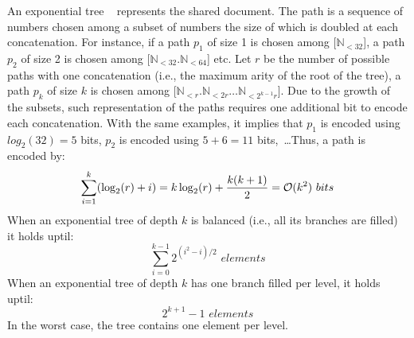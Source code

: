 \begin{asparadesc}
\item [An exponential tree]~\cite{andersson1996faster,andersson2007dynamic}
  represents the shared document. The path is a sequence of numbers chosen among
  a subset of numbers the size of which is doubled at each concatenation. For
  instance, if a path $p_1$ of size 1 is chosen among [$\mathbb{N}_{<32}$], a
  path $p_2$ of size 2 is chosen among [$\mathbb{N}_{<32}.\mathbb{N}_{<64}$]
  etc. Let $r$ be the number of possible paths with one concatenation (i.e., the
  maximum arity of the root of the tree), a path $p_k$ of size $k$ is chosen
  among [$\mathbb{N}_{<r}.\mathbb{N}_{<2r}\ldots\mathbb{N}_{<2^{k-1}r}$].  Due
  to the growth of the subsets, such representation of the paths requires one
  additional bit to encode each concatenation. With the same examples, it
  implies that $p_1$ is encoded using $log_2(32)=5$ bits, $p_2$ is encoded using
  $5+6=11$ bits,~\ldots Thus, a path is encoded by:
  \begin{equation}
    \sum\limits_{i=1}^{k}(\log_2(r)+i) =
    k\log_2(r) + {k(k+1)\over{2}} = \mathcal{O}(k^2) \,\, bits
  \end{equation}
  When an exponential tree of depth $k$ is balanced (i.e., all its branches
  are filled) it holds uptil:
  \begin{equation} \sum\limits_{i=0}^{k-1} {2^{(i^2-i)/2}} \,\, elements
  \end{equation}
  When an exponential tree of depth $k$ has one branch filled per level, it
  holds uptil:
  \begin{equation} 2^{k+1}-1 \,\, elements\end{equation} 
  In the worst case, the tree contains one element per level.
  

\end{asparadesc}
